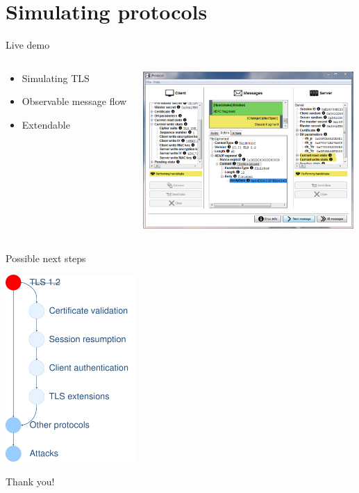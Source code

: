 \section{Simulating protocols}


%
%
%
%

\begin{frame}[c] {Live demo}
\begin{columns}[c]
		\begin{column}{.4\textwidth}
			\begin{itemize}
				\item Simulating TLS
				\item Observable message flow
				\item Extendable 
			\end{itemize}
		\end{column}		
		\begin{column}{.6\textwidth}
			\includegraphics[width=8cm]{pic/ScreenshotTLS.png}
		\end{column}
	\end{columns}
\end{frame}

\begin{frame}[c]{Possible next steps}
	\begin{center}
		\includegraphics[width=5cm]{pic/TODO.pdf}
	\end{center}
\end{frame}

\begin{frame}[c]{}
\begin{center}
\LARGE Thank you!
\end{center}
\end{frame}

